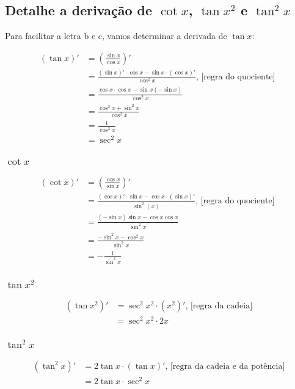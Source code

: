 \documentclass[12pt]{article}
\theoremstyle{definition}
\begin{document}
\subsection{Detalhe a derivação de \(\cot{x}\), \(\tan{x^2}\) e \(\tan^2{x}\)}

Para facilitar a letra b e c, vamos determinar a derivada de \(\tan{x}\):

\begin{align*}
    (\tan{x})'
    &= \left( \frac{\sin{x}}{\cos{x}} \right)' \\
    &= \frac{(\sin{x})' \cdot \cos{x} - \sin{x} \cdot (\cos{x})'}{\cos^2{x}} \text{, [regra do quociente] } \\
    &= \frac{\cos{x}\cdot\cos{x} - \sin{x}(-\sin{x})}{\cos^2{x}} \\
    &= \frac{\cos^2{x} + \sin^2{x}}{\cos^2{x}} \\
    &= \frac{1}{\cos^2{x}} \\
    &= \sec^2{x}
\end{align*}

\subsubsection{\(\cot{x}\)}
\begin{align*}
    (\cot{x})'
    &= \left(\frac{\cos{x}}{\sin{x}}\right)' \\
    &= \frac{(\cos{x})'\cdot\sin{x}-\cos{x}\cdot(\sin{x})'}{\sin^2(x)} \text{, [regra do quociente] }\\
    &= \frac{(-\sin{x})\sin{x}-\cos{x}\cos{x}}{\sin^2{x}} \\
    &= \frac{-\sin^2{x}-\cos^2{x}}{\sin^2{x}} \\
    &= -\frac{1}{\sin^2{x}}
\end{align*}

\subsubsection{\(\tan{x^2}\)}
\begin{align*}
    (\tan{x^2})'
    &= \sec^2{x^2}\cdot (x^2)' \text{, [regra da cadeia]} \\
    &= \sec^2{x^2}\cdot 2x
\end{align*}

\subsubsection{\(\tan^2{x}\)}
\begin{align*}
    (\tan^2{x})'
    &= 2\tan{x}\cdot (\tan{x})' \text{, [regra da cadeia e da potência]} \\
    &= 2\tan{x}\cdot \sec^2{x}
\end{align*}
\end{document}
